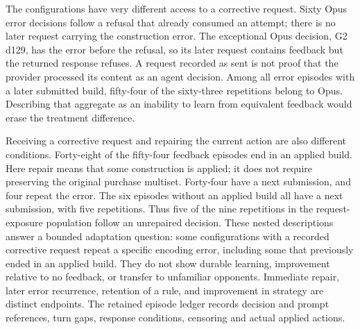 The configurations have very different access to a corrective request. Sixty Opus error decisions follow a refusal that already consumed an attempt; there is no later request carrying the construction error. The exceptional Opus decision, G2 d129, has the error before the refusal, so its later request contains feedback but the returned response refuses. A request recorded as sent is not proof that the provider processed its content as an agent decision. Among all error episodes with a later submitted build, fifty-four of the sixty-three repetitions belong to Opus. Describing that aggregate as an inability to learn from equivalent feedback would erase the treatment difference.

Receiving a corrective request and repairing the current action are also different conditions. Forty-eight of the fifty-four feedback episodes end in an applied build. Here repair means that some construction is applied; it does not require preserving the original purchase multiset. Forty-four have a next submission, and four repeat the error. The six episodes without an applied build all have a next submission, with five repetitions. Thus five of the nine repetitions in the request-exposure population follow an unrepaired decision. These nested descriptions answer a bounded adaptation question: some configurations with a recorded corrective request repeat a specific encoding error, including some that previously ended in an applied build. They do not show durable learning, improvement relative to no feedback, or transfer to unfamiliar opponents. Immediate repair, later error recurrence, retention of a rule, and improvement in strategy are distinct endpoints. The retained episode ledger records decision and prompt references, turn gaps, response conditions, censoring and actual applied actions.
